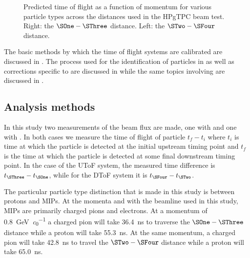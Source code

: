 \begin{figure}[h]
  \begin{minipage}[t]{.5\linewidth}
    \begin{adjustbox}{max totalsize=\textwidth, center}
      
    \end{adjustbox}
  \end{minipage}
  \hfill
  \begin{minipage}[t]{.5\linewidth}
    \begin{adjustbox}{max totalsize=\textwidth, center}
      
    \end{adjustbox}
  \end{minipage}
  \caption[Predicted time of flight as a function of momentum for various particle types across the distances used in the HPgTPC beam test]{Predicted time of flight as a function of momentum for various particle types across the distances used in the HPgTPC beam test. Right: the $\SOne - \SThree$ distance. Left: the $\STwo - \SFour$ distance.}
  \label{fig:tofVsMom}
\end{figure}

The basic methods by which the time of flight systems are calibrated are discussed in .
The process used for the identification of particles in \SThree as well as corrections specific to \SThree are discussed in  while the same topics involving \SFour are discussed in .

\subsection{Analysis methods}
\label{sec:hptpc_beam_flux:methods:general}

In this study two measurements of the beam flux are made, one with \SThree and one with \SFour.
In both cases we measure the time of flight of particle $t_{f}-t_{i}$ where $t_{i}$ is time at which the particle is detected at the initial upstream timing point and $t_{f}$ is the time at which the particle is detected at some final downstream timing point.
In the case of the UToF system, the measured time difference is $t_{\SThree} - t_{\SOne}$, while for the DToF system it is $t_{\SFour} - t_{\STwo}$.

The particular particle type distinction that is made in this study is between protons and MIPs.
At the momenta and with the beamline used in this study, MIPs are primarily charged pions and electrons.
At a momentum of \SI{0.8}{\giga\electronvolt\per\clight} a charged pion will take \SI{36.4}{\nano\second} to traverse the $\SOne - \SThree$ distance while a proton will take \SI{55.3}{\nano\second}.
At the same momentum, a charged pion will take \SI{42.8}{\nano\second} to travel the $\STwo - \SFour$ distance while a proton will take \SI{65.0}{\nano\second}.

